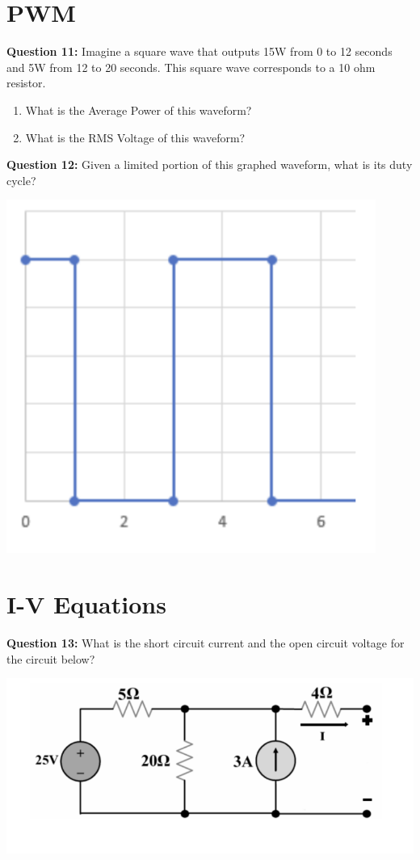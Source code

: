 \documentclass{article}
\begin{document}
\section*{PWM}
\textbf{Question 11:} Imagine a square wave that outputs 15W from 0 to 12 seconds and 5W from 12 to 20 seconds. This square wave corresponds to a 10 ohm resistor.
\begin{enumerate}
    \item What is the Average Power of this waveform?
    \item What is the RMS Voltage of this waveform?
\end{enumerate}
\textbf{Question 12:} Given a limited portion of this graphed waveform, what is its duty cycle?

\begin{center}

        \includegraphics[width=0.75\linewidth]{figures/8.png}
\end{center}

\pagebreak

\section*{I-V Equations}
\textbf{Question 13:} What is the short circuit current and the open circuit voltage for the circuit below?
\begin{center}

        \includegraphics[width=0.75\linewidth]{figures/12.png}

\end{center}
\end{document}
